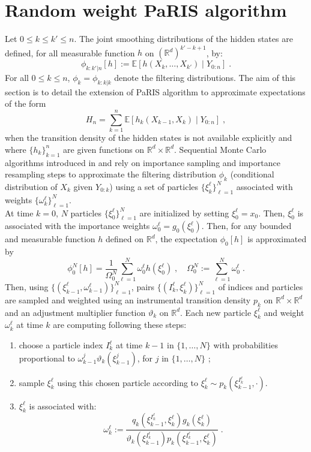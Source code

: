 \documentclass[12pt]{article}
\newcommand{\eqsp}{\;}
\newcommand{\1}{\mathrm{1}}
\newcommand{\qk}{q_{k}}
\begin{document}
\section{Random weight PaRIS algorithm}
Let $0 \leq k \leq k' \leq n$. The joint smoothing distributions of the hidden states are defined, for all measurable function $h$ on $(\mathbb{R}^d)^{k'-k + 1}$, by:
\[
\phi_{k:k'|n}[h] := \mathbb{E}\left[h(X_k,\ldots,X_{k'})\middle|Y_{0:n}\right]\eqsp.
\]
For all $0\le k\le n$, $\phi_{k} = \phi_{k:k|k}$ denote the filtering distributions. The aim of this section is to detail the extension of PaRIS algorithm to approximate expectations of the form
\begin{equation}
\label{def:addfunc}
H_{n} =  \sum_{k=1}^n\mathbb{E}\left[h_k(X_{k-1},X_k)\middle|Y_{0:n}\right]\eqsp,
\end{equation}
when the transition density of the hidden states is not available explicitly and where $\{h_k\}_{k=1}^n$ are given functions on $\mathbb{R}^d\times \mathbb{R}^d$.
Sequential Monte Carlo algorithms introduced in  \cite{gordon:salmond:smith:1993} and \cite{kitagawa:1996} rely on importance sampling and importance resampling steps to approximate the filtering distribution $\phi_{k}$ (conditional distribution of $X_k$ given $Y_{0:k}$) using  a set of particles $\{\xi^{\ell}_k\}_{\ell=1}^N$ associated with weights $\{\omega^{\ell}_k\}_{\ell=1}^N$.\\
At time $k = 0$, $N$ particles $\{\xi^{\ell}_0\}_{\ell=1}^N$ are initialized by setting $\xi^{\ell}_0=x_0$. Then, $\xi^{\ell}_0$ is associated with the importance weights $\omega_0^{\ell} = g_0 \left(\xi^{\ell}_0\right)$. 
Then, for any bounded and measurable function $h$ defined on $\mathbb{R}^d$, the expectation $\phi_{0}[h] $ is approximated by
\[
\phi^N_{0}[h] = \frac{1}{\Omega_0^N} \sum_{\ell=1}^N \omega_0^{\ell} h \left(\xi^{\ell}_0 \right)\eqsp, \quad \Omega_0^N:= \sum_{\ell=1}^N \omega_0^{\ell}\eqsp.
\]
Then, using $\{(\xi^{\ell}_{k-1},\omega^{\ell}_{k-1})\}_{\ell=1}^N$, pairs $\{(I^{\ell}_k,\xi^{\ell}_{k})\}_{\ell=1}^N$ of indices and particles are sampled and weighted using an instrumental transition density $p_k$ on $\mathbb{R}^d\times \mathbb{R}^d$ and an adjustment multiplier function $\vartheta_k$ on $\mathbb{R}^d$. Each new particle $\xi^{\ell}_{k}$ and weight $\omega^{\ell}_k$ at time $k$ are computing following these steps:
\begin{enumerate}
\item choose a particle index $I^{\ell}_k$ at time $k-1$ in $\{1,\ldots,N\}$ with probabilities proportional to $\omega_{k-1}^{j} \vartheta_k (\xi^{j}_{k-1})$, for $j$ in $\{1,\ldots,N\}$ ;
\item sample  $\xi^{\ell}_{k}$ using this chosen particle according to $\xi^{\ell}_{k} \sim p_k(\xi^{I^{\ell}_k}_{k-1},\cdot)$.
\item $\xi^{\ell}_k$ is associated with:
\[
\omega^{\ell}_k := \frac{\qk(\xi_{k-1}^{I^{\ell}_k},\xi^{\ell}_k)g_k(\xi^{\ell}_k)}{\vartheta_k(\xi^{I^{\ell}_k}_{k-1}) p_k (\xi_{k-1}^{I^{\ell}_k},\xi^{\ell}_k)}\eqsp.
\]
\end{enumerate} 
\end{document}
